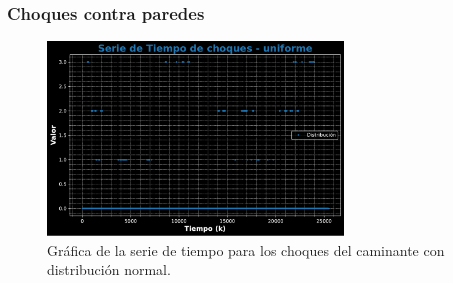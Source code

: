 \documentclass[11pt]{article} %
\begin{document}
	 
	 \newpage
	 \subsubsection{Choques contra paredes}
	 \begin{figure}[h]
	 	\centering
	 	\includegraphics[width=0.7\textwidth]{graf_choques_uniforme.pdf}
	 	\caption{Gráfica de la serie de tiempo para los choques del caminante con distribución normal.}
	 	\label{fig:chUnifGraf}
	 \end{figure}
\end{document}

